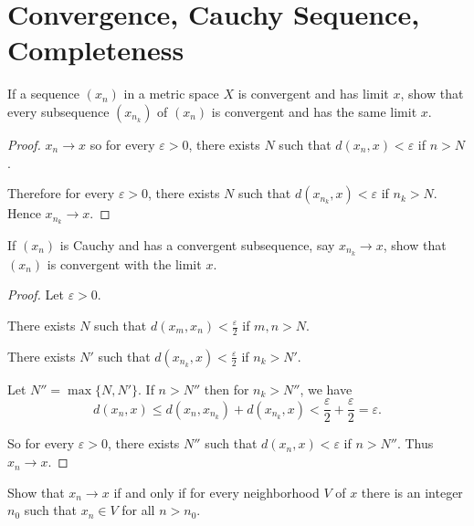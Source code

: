 \section{Convergence, Cauchy Sequence, Completeness}

\begin{exercise}[Subsequence]\label{chapter1:section4:exercise1}
    If a sequence $(x_{n})$ in a metric space $X$ is convergent and has limit $x$, show that every subsequence $(x_{n_{k}})$ of $(x_{n})$ is convergent and has the same limit $x$.
\end{exercise}

\begin{proof}
    $x_{n}\to x$ so for every $\varepsilon > 0$, there exists $N$ such that $d(x_{n}, x) < \varepsilon$ if $n > N$.

    Therefore for every $\varepsilon > 0$, there exists $N$ such that $d(x_{n_{k}}, x) < \varepsilon$ if $n_{k} > N$. Hence $x_{n_{k}}\to x$.
\end{proof}

\begin{exercise}\label{chapter1:section4:exercise2}
    If $(x_{n})$ is Cauchy and has a convergent subsequence, say $x_{n_{k}}\to x$, show that $(x_{n})$ is convergent with the limit $x$.
\end{exercise}

\begin{proof}
    Let $\varepsilon > 0$.

    There exists $N$ such that $d(x_{m}, x_{n}) < \frac{\varepsilon}{2}$ if $m, n > N$.

    There exists $N'$ such that $d(x_{n_{k}}, x) < \frac{\varepsilon}{2}$ if $n_{k} > N'$.

    Let $N'' = \max\{ N, N' \}$. If $n > N''$ then for $n_{k} > N''$, we have
    \[
        d(x_{n}, x)\leq d(x_{n}, x_{n_{k}}) + d(x_{n_{k}}, x) < \frac{\varepsilon}{2} + \frac{\varepsilon}{2} = \varepsilon.
    \]

    So for every $\varepsilon > 0$, there exists $N''$ such that $d(x_{n}, x) < \varepsilon$ if $n > N''$. Thus $x_{n}\to x$.
\end{proof}

\begin{exercise}\label{chapter1:section4:exercise3}
    Show that $x_{n}\to x$ if and only if for every neighborhood $V$ of $x$ there is an integer $n_{0}$ such that $x_{n}\in V$ for all $n > n_{0}$.
\end{exercise}


